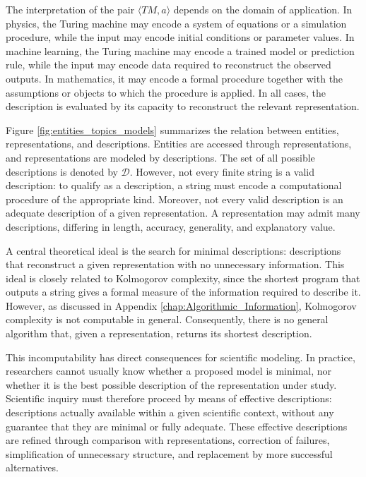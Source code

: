 The interpretation of the pair $\langle TM,a\rangle$ depends on the domain of application. In physics, the Turing machine may encode a system of equations or a simulation procedure, while the input may encode initial conditions or parameter values. In machine learning, the Turing machine may encode a trained model or prediction rule, while the input may encode data required to reconstruct the observed outputs. In mathematics, it may encode a formal procedure together with the assumptions or objects to which the procedure is applied. In all cases, the description is evaluated by its capacity to reconstruct the relevant representation.

Figure \ref{fig:entities_topics_models} summarizes the relation between entities, representations, and descriptions. Entities are accessed through representations, and representations are modeled by descriptions. The set of all possible descriptions is denoted by $\mathcal{D}$. However, not every finite string is a valid description: to qualify as a description, a string must encode a computational procedure of the appropriate kind. Moreover, not every valid description is an adequate description of a given representation. A representation may admit many descriptions, differing in length, accuracy, generality, and explanatory value.

A central theoretical ideal is the search for minimal descriptions: descriptions that reconstruct a given representation with no unnecessary information. This ideal is closely related to Kolmogorov complexity, since the shortest program that outputs a string gives a formal measure of the information required to describe it. However, as discussed in Appendix \ref{chap:Algorithmic_Information}, Kolmogorov complexity is not computable in general. Consequently, there is no general algorithm that, given a representation, returns its shortest description.

This incomputability has direct consequences for scientific modeling. In practice, researchers cannot usually know whether a proposed model is minimal, nor whether it is the best possible description of the representation under study. Scientific inquiry must therefore proceed by means of effective descriptions: descriptions actually available within a given scientific context, without any guarantee that they are minimal or fully adequate. These effective descriptions are refined through comparison with representations, correction of failures, simplification of unnecessary structure, and replacement by more successful alternatives.

